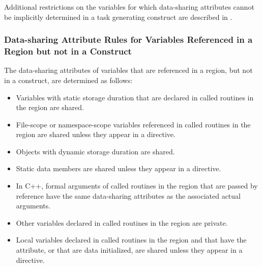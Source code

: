 {{{{Additional restrictions on the variables for which data-sharing attributes cannot be 
implicitly determined in a task generating construct are described in
.







\pagebreak

\subsubsection{Data-sharing Attribute Rules for Variables Referenced in a Region but not in a Construct}
\label{subsubsec:Data-sharing Attribute Rules for Variables Referenced in a Region but not in a Construct}
The data-sharing attributes of variables that are referenced in a region, but not in a 
construct, are determined as follows: 

\ccppspecificstart
\begin{itemize}
\item Variables with static storage duration that are declared in called routines in the region 
are shared.

\item File-scope or namespace-scope variables referenced in called routines in the region 
are shared unless they appear in a  directive.

\item Objects with dynamic storage duration are shared.

\item Static data members are shared unless they appear in a  directive.

\item In C++, formal arguments of called routines in the region that are passed by reference have the same data-sharing attributes as the associated actual arguments. 

\item Other variables declared in called routines in the region are private.
\end{itemize}
\ccppspecificend

\fortranspecificstart
\begin{itemize}
\item Local variables declared in called routines in the region and that have the  
attribute, or that are data initialized, are shared unless they appear in a 
 directive.


\end{itemize}}}}}
